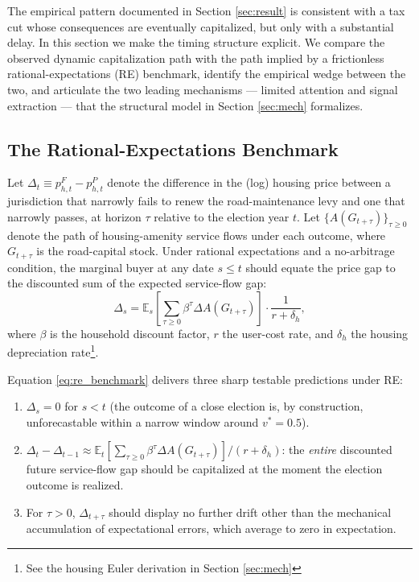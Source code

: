 %

The empirical pattern documented in Section \ref{sec:result} is consistent with a tax cut whose consequences are eventually capitalized, but only with a substantial delay. In this section we make the timing structure explicit. We compare the observed dynamic capitalization path with the path implied by a frictionless rational-expectations (RE) benchmark, identify the empirical wedge between the two, and articulate the two leading mechanisms --- limited attention and signal extraction --- that the structural model in Section \ref{sec:mech} formalizes.

\subsection{The Rational-Expectations Benchmark}

Let $\Delta_t \equiv p_{h,t}^{F} - p_{h,t}^{P}$ denote the difference in the (log) housing price between a jurisdiction that narrowly fails to renew the road-maintenance levy and one that narrowly passes, at horizon $\tau$ relative to the election year $t$. Let $\{A(G_{t+\tau})\}_{\tau \geq 0}$ denote the path of housing-amenity service flows under each outcome, where $G_{t+\tau}$ is the road-capital stock. Under rational expectations and a no-arbitrage condition, the marginal buyer at any date $s \leq t$ should equate the price gap to the discounted sum of the expected service-flow gap:
\begin{equation}
\Delta_s = \mathbb{E}_s \!\left[\sum_{\tau \geq 0} \beta^{\tau} \Delta A(G_{t+\tau}) \right] \cdot \frac{1}{r + \delta_h},
\label{eq:re_benchmark}
\end{equation}
where $\beta$ is the household discount factor, $r$ the user-cost rate, and $\delta_h$ the housing depreciation rate\footnote{See the housing Euler derivation in Section \ref{sec:mech}}.

Equation \ref{eq:re_benchmark} delivers three sharp testable predictions under RE:
\begin{enumerate}
\item[\textbf{P1.}] $\Delta_s = 0$ for $s < t$ (the outcome of a close election is, by construction, unforecastable within a narrow window around $v^* = 0.5$).
\item[\textbf{P2.}] $\Delta_{t} - \Delta_{t-1} \approx \mathbb{E}_t [\sum_{\tau \geq 0} \beta^{\tau} \Delta A(G_{t+\tau})] / (r+\delta_h)$: the {\it entire} discounted future service-flow gap should be capitalized at the moment the election outcome is realized.
\item[\textbf{P3.}] For $\tau > 0$, $\Delta_{t+\tau}$ should display no further drift other than the mechanical accumulation of expectational errors, which average to zero in expectation.
\end{enumerate}

